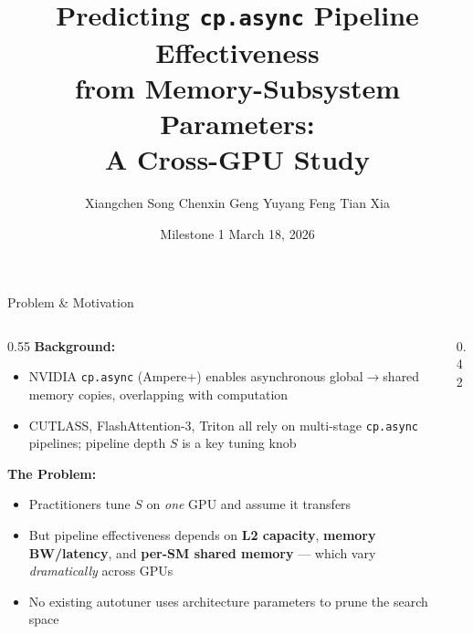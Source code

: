 \documentclass[aspectratio=169,10pt]{beamer}
\title[cp.async Cross-GPU Study]{Predicting \texttt{cp.async} Pipeline Effectiveness\\from Memory-Subsystem Parameters:\\A Cross-GPU Study}
\author{Xiangchen Song \quad Chenxin Geng \quad Yuyang Feng \quad Tian Xia}
\institute{EECS 570 -- Parallel Computer Architecture \\ University of Michigan}
\date{Milestone 1 \quad March 18, 2026}
\begin{document}
\begin{frame}
\titlepage
\end{frame}

\begin{frame}{Problem \& Motivation}

\begin{columns}[T]
\begin{column}{0.55\textwidth}
\textbf{Background:}
\begin{itemize}
    \item NVIDIA \texttt{cp.async} (Ampere+) enables asynchronous global$\to$shared memory copies, overlapping with computation
    \item CUTLASS, FlashAttention-3, Triton all rely on multi-stage \texttt{cp.async} pipelines; pipeline depth $S$ is a key tuning knob
\end{itemize}

\vspace{0.5em}
\textbf{The Problem:}
\begin{itemize}
    \item Practitioners tune $S$ on \emph{one} GPU and assume it transfers
    \item But pipeline effectiveness depends on \textbf{L2 capacity}, \textbf{memory BW/latency}, and \textbf{per-SM shared memory} --- which vary \emph{dramatically} across GPUs
    \item No existing autotuner uses architecture parameters to prune the search space
\end{itemize}
\end{column}

\begin{column}{0.42\textwidth}
\end{column}
\end{columns}
\end{frame}
\end{document}
